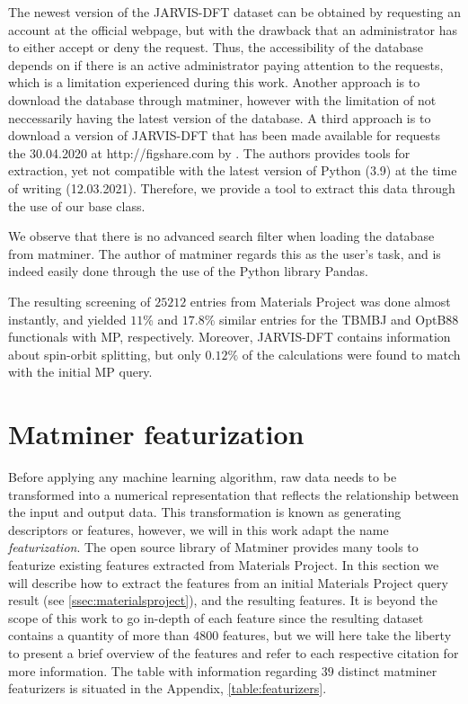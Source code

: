 The newest version of the JARVIS-DFT dataset can be obtained by requesting an account at the official webpage, but with the drawback that an administrator has to either accept or deny the request. Thus, the accessibility of the database depends on if there is an active administrator paying attention to the requests, which is a limitation experienced during this work. Another approach is to download the database through matminer, however with the limitation of not neccessarily having the latest version of the database. A third approach is to download a version of JARVIS-DFT that has been made available for requests the 30.04.2020 at http://figshare.com by \citeauthor{Choudhary2020} \cite{Choudhary2020}. The authors provides tools for extraction, yet not compatible with the latest version of Python (3.9) at the time of writing (12.03.2021). Therefore, we provide a tool to extract this data through the use of our base class.



We observe that there is no advanced search filter when loading the database from matminer. The author of matminer regards this as the user's task, and is indeed easily done through the use of the Python library Pandas.

The resulting screening of $25212$ entries from Materials Project was done almost instantly, and yielded $11$\% and $17.8$\% similar entries for the TBMBJ and OptB88 functionals with MP, respectively. Moreover, JARVIS-DFT contains information about spin-orbit splitting, but only $0.12\%$ of the calculations were found to match with the initial MP query.

\section{Matminer featurization}

Before applying any machine learning algorithm, raw data needs to be transformed into a numerical representation that reflects the relationship between the input and output data. This transformation is known as generating descriptors or features, however, we will in this work adapt the name \textit{featurization}. The open source library of Matminer provides many tools to featurize existing features extracted from Materials Project. In this section we will describe how to extract the features from an initial Materials Project query result (see \autoref{ssec:materialsproject}), and the resulting features. It is beyond the scope of this work to go in-depth of each feature since the resulting dataset contains a quantity of more than $4800$ features, but we will here take the liberty to present a brief overview of the features and refer to each respective citation for more information. The table with information regarding $39$ distinct matminer featurizers is situated in the Appendix, \autoref{table:featurizers}.

